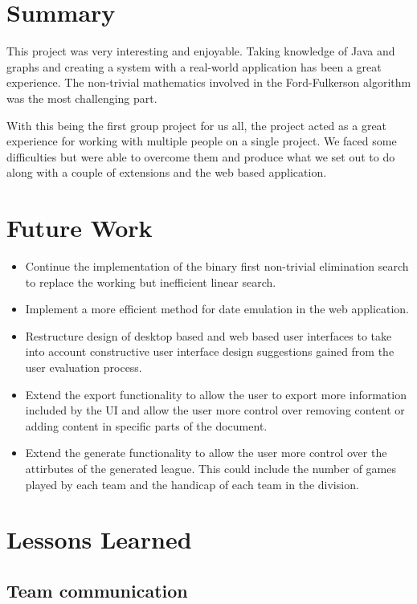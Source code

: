 \section{Summary}

This project was very interesting and enjoyable. Taking knowledge of Java
and graphs and creating a system with a real-world application has been a
great experience. The non-trivial mathematics involved in the Ford-Fulkerson
algorithm was the most challenging part.

With this being the first group project for us all, the project acted as a
great experience for working with multiple people on a single project. We
faced some difficulties but were able to overcome them and produce what we
set out to do along with a couple of extensions and the web based application.

\section{Future Work}

\begin{itemize}
\item Continue the implementation of the binary first non-trivial elimination
search to replace the working but inefficient linear search.
\item Implement a more efficient method for date emulation in the web
application.
\item Restructure design of desktop based and web based user interfaces to
take into account constructive user interface design suggestions gained from
the user evaluation process.
\item Extend the export functionality to allow the user to export more
  information included by the UI and allow the user more control over
  removing content or adding content in specific parts of the
  document.
\item Extend the generate functionality to allow the user more control
  over the attirbutes of the generated league. This could include the
  number of games played by each team and the handicap of each team in
  the division.
\end{itemize}

\section{Lessons Learned}

\subsection{Team communication}

